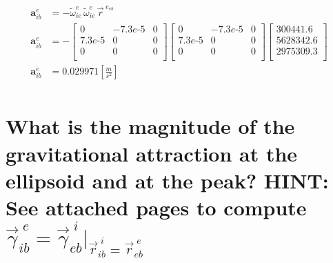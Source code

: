 \documentclass[12pt,letterpaper, onecolumn]{exam}
\begin{document}
\begin{questions}
\begin{parts}
{            \begin{equation}
                \begin{split}
                    \mathbf{a}_{ib}^e & = -\tilde{\omega}^{e}_{ie}\,\tilde{\omega}^{e}_{ie}\,\vec{r}^{\;e_{eb}}\\
                    \mathbf{a}_{ib}^e & = -
                    \begin{bmatrix}
                        0             & -7.3e\text{-}5 & 0 \\
                        7.3e\text{-}5 & 0              & 0 \\
                        0             & 0              & 0 \\
                    \end{bmatrix}
                    \begin{bmatrix}
                        0             & -7.3e\text{-}5 & 0 \\
                        7.3e\text{-}5 & 0              & 0 \\
                        0             & 0              & 0 \\
                    \end{bmatrix}
                    \begin{bmatrix}
                        300441.6  \\
                        5628342.6 \\
                        2975309.3 \\
                    \end{bmatrix}\\
                    \mathbf{a}_{ib}^e & = 0.029971 \left[\frac{m}{s^2} \right]\\
                \end{split}
                \label{eq:22}
            \end{equation}
        }

        \part{What is the magnitude of the gravitational attraction at the ellipsoid and at the peak? HINT: See \textbf{attached pages} to compute $\vec{\gamma}^{\;e}_{ib} = \vec{\gamma}^{\;i}_{eb} \vert_{\vec{r}^{\;i}_{ib} = \vec{r}^{\;e}_{eb}}$}


\end{parts}
\end{questions}
\end{document}
